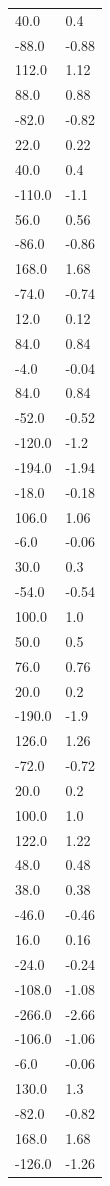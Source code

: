 \begin{longtable}{ll}
40.0 & 0.4 \\
-88.0 & -0.88 \\
112.0 & 1.12 \\
88.0 & 0.88 \\
-82.0 & -0.82 \\
22.0 & 0.22 \\
40.0 & 0.4 \\
-110.0 & -1.1 \\
56.0 & 0.56 \\
-86.0 & -0.86 \\
168.0 & 1.68 \\
-74.0 & -0.74 \\
12.0 & 0.12 \\
84.0 & 0.84 \\
-4.0 & -0.04 \\
84.0 & 0.84 \\
-52.0 & -0.52 \\
-120.0 & -1.2 \\
-194.0 & -1.94 \\
-18.0 & -0.18 \\
106.0 & 1.06 \\
-6.0 & -0.06 \\
30.0 & 0.3 \\
-54.0 & -0.54 \\
100.0 & 1.0 \\
50.0 & 0.5 \\
76.0 & 0.76 \\
20.0 & 0.2 \\
-190.0 & -1.9 \\
126.0 & 1.26 \\
-72.0 & -0.72 \\
20.0 & 0.2 \\
100.0 & 1.0 \\
122.0 & 1.22 \\
48.0 & 0.48 \\
38.0 & 0.38 \\
-46.0 & -0.46 \\
16.0 & 0.16 \\
-24.0 & -0.24 \\
-108.0 & -1.08 \\
-266.0 & -2.66 \\
-106.0 & -1.06 \\
-6.0 & -0.06 \\
130.0 & 1.3 \\
-82.0 & -0.82 \\
168.0 & 1.68 \\
-126.0 & -1.26 \\

\end{longtable}

